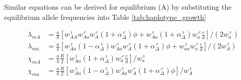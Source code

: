 \documentclass[12pt]{article}
\begin{document}


Similar equations can be derived for equilibrium (A) by substituting the equilibrium allele frequencies into Table \ref{tab:haplotype_growth}

\begin{subequations}\label{Ainvasion}
\begin{align}
\lambda_{mA}&= \frac{a}{b} \left[w_{AA}^\female w_{Aa}^\male w_A^\male (1+\alpha^\male_\Delta) \phi +  w_{Aa}^\female (1+\alpha^\female_\Delta) w_a^\male \frac{c}{d}\right] / (2 w_a^\female) \\
\lambda_{ma}&= \frac{a}{b} \left[ w_{Aa}^\female (1-\alpha^\female_\Delta) w_{Aa}^\male w_A^\male (1+\alpha^\male_\Delta) \phi +  w_{aa}^\female w_a^\male \frac{c}{d}\right] / (2 w_A^\female) \\
\chi_{mA}&= \frac{a}{b} \frac{R}{2} \left[   w_{Aa}^\female (1+\alpha^\female_\Delta) w_a^\male \frac{c}{d} \right] / w_a^\female\\ 
\chi_{ma}&= \frac{a}{b} \frac{R}{2} \left[ w_{Aa}^\female (1-\alpha^\female_\Delta) w_{Aa}^\male w_A^\male (1+\alpha^\male_\Delta) \phi \right] / w_A^\female
\end{align}
\end{subequations}
\end{document}
